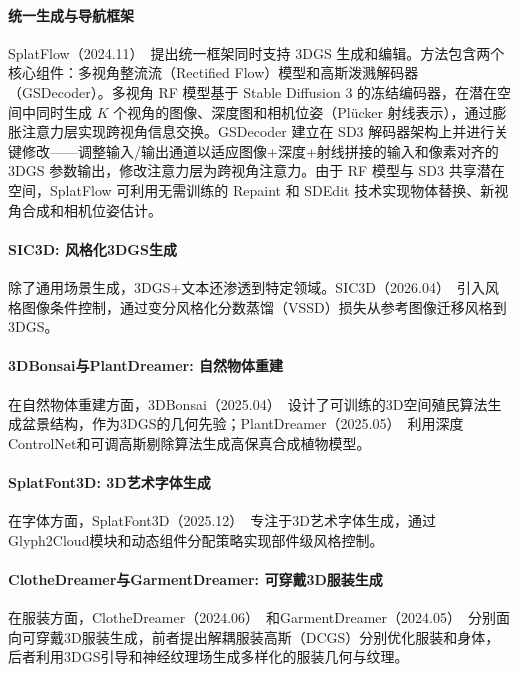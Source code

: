 \paragraph{统一生成与导航框架}

SplatFlow（2024.11）~\cite{2411_16443}提出统一框架同时支持 3DGS 生成和编辑。方法包含两个核心组件：多视角整流流（Rectified Flow）模型和高斯泼溅解码器（GSDecoder）。多视角 RF 模型基于 Stable Diffusion 3 的冻结编码器，在潜在空间中同时生成 $K$ 个视角的图像、深度图和相机位姿（Pl\"ucker 射线表示），通过膨胀注意力层实现跨视角信息交换。GSDecoder 建立在 SD3 解码器架构上并进行关键修改——调整输入/输出通道以适应图像+深度+射线拼接的输入和像素对齐的 3DGS 参数输出，修改注意力层为跨视角注意力。由于 RF 模型与 SD3 共享潜在空间，SplatFlow 可利用无需训练的 Repaint 和 SDEdit 技术实现物体替换、新视角合成和相机位姿估计。

\paragraph{SIC3D: 风格化3DGS生成}

除了通用场景生成，3DGS+文本还渗透到特定领域。SIC3D（2026.04）~\cite{2604_08760}引入风格图像条件控制，通过变分风格化分数蒸馏（VSSD）损失从参考图像迁移风格到3DGS。

\paragraph{3DBonsai与PlantDreamer: 自然物体重建}

在自然物体重建方面，3DBonsai（2025.04）~\cite{2504_01619}设计了可训练的3D空间殖民算法生成盆景结构，作为3DGS的几何先验；PlantDreamer（2025.05）~\cite{2505_15528}利用深度ControlNet和可调高斯剔除算法生成高保真合成植物模型。

\paragraph{SplatFont3D: 3D艺术字体生成}

在字体方面，SplatFont3D（2025.12）~\cite{2512_00413}专注于3D艺术字体生成，通过Glyph2Cloud模块和动态组件分配策略实现部件级风格控制。

\paragraph{ClotheDreamer与GarmentDreamer: 可穿戴3D服装生成}

在服装方面，ClotheDreamer（2024.06）~\cite{2406_16815}和GarmentDreamer（2024.05）~\cite{2405_12420}分别面向可穿戴3D服装生成，前者提出解耦服装高斯（DCGS）分别优化服装和身体，后者利用3DGS引导和神经纹理场生成多样化的服装几何与纹理。

